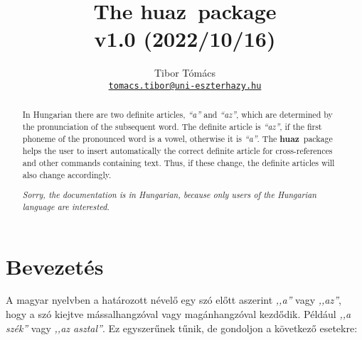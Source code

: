 \documentclass[12pt]{article}
\newcommand{\verbinline}{\lstinline[
delim={[is][\color{green!50!black}\normalfont\small\sffamily]{!}{!}},
basicstyle=\normalfont\ttfamily,
columns=fullflexible,
keepspaces]}
\def\huaz{\textbf{\sffamily hu\color{gray}az}}
\begin{document}
\title{The \huaz\ package\\
       {\large v1.0 (2022/10/16)}}
\author{Tibor Tómács\\
        {\normalsize\href{email:tomacs.tibor@uni-eszterhazy.hu}{\nolinkurl{tomacs.tibor@uni-eszterhazy.hu}}}}
\date{}
\maketitle

\begin{otherlanguage}{english}
\begin{abstract}
In Hungarian there are two definite articles, \emph{``a''} and \emph{``az''}, which are determined by the pronunciation of the subsequent word. The definite article is \emph{``az''}, if the first phoneme of the pronounced word is a vowel, otherwise it is \emph{``a''}.
The \huaz\ package helps the user to insert automatically the correct definite article for cross-references and other commands containing text. Thus, if these change, the definite articles will also change accordingly.

\medskip
\emph{Sorry, the documentation is in Hungarian, because only users of the Hungarian language are interested.}
\end{abstract}
\end{otherlanguage}

\section{Bevezetés}

A magyar nyelvben a határozott névelő egy szó előtt aszerint \emph{,,a''} vagy \emph{,,az''}, hogy a szó kiejtve mássalhangzóval vagy magánhangzóval kezdődik. Például \emph{,,a szék''} vagy \emph{,,az asztal''}. Ez egyszerűnek tűnik, de gondoljon a következő esetekre:

\end{document}
